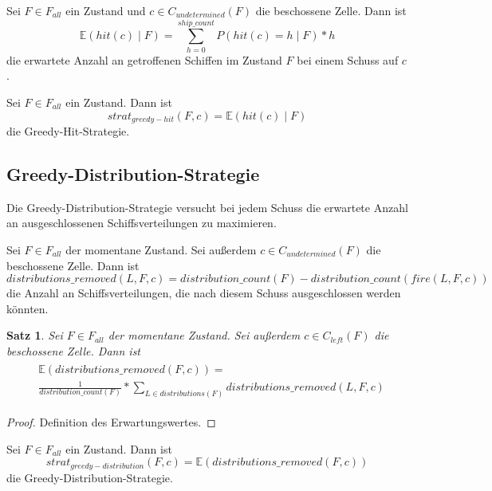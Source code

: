 \documentclass[a4paper,12pt]{llncs}
\numberwithin{equation}{section}
\newtheorem{satz}{Satz}
\begin{document}
\begin{definition}
Sei $F\in F_{all}$ ein Zustand und $c \in C_{undetermined}(F)$ die beschossene Zelle.
Dann ist
\[
\mathds{E}(hit(c) \mid F)=\sum_{h=0}^{ship\_count} P(hit(c)=h \mid F) * h
\]
die erwartete Anzahl an getroffenen Schiffen im Zustand $F$ bei einem Schuss auf $c$.
\end{definition}

\begin{definition}
Sei $F\in F_{all}$ ein Zustand.
Dann ist
\[
strat_{greedy-hit}(F,c)=\mathds{E}(hit(c) \mid F)
\]
die Greedy-Hit-Strategie.
\end{definition}

\subsection{Greedy-Distribution-Strategie}
Die Greedy-Distribution-Strategie versucht bei jedem Schuss die erwartete Anzahl an ausgeschlossenen Schiffsverteilungen zu maximieren.

\begin{definition}
Sei $F\in F_{all}$ der momentane Zustand.
Sei außerdem $c \in C_{undetermined}(F)$ die beschossene Zelle.
Dann ist
\[
distributions\_removed(L, F, c)=distribution\_count(F) - distribution\_count(fire(L, F,c))
\]
die Anzahl an Schiffsverteilungen, die nach diesem Schuss ausgeschlossen werden könnten.
\end{definition}

\begin{satz}
Sei $F\in F_{all}$ der momentane Zustand.
Sei außerdem $c \in C_{left}(F)$ die beschossene Zelle.
Dann ist
\begin{align}
\begin{split}
&\mathds{E}(distributions\_removed(F,c))=\\
&\frac{1}{distribution\_count(F)} * \sum_{L \in distributions(F)} distributions\_removed(L, F, c) \nonumber
\end{split}
\end{align}
\end{satz}

\begin{proof}
Definition des Erwartungswertes.
\end{proof}

\begin{definition}
Sei $F\in F_{all}$ ein Zustand.
Dann ist
\[
strat_{greedy-distribution}(F,c)=\mathds{E}(distributions\_removed(F,c))
\]
die Greedy-Distribution-Strategie.
\end{definition}
\end{document}
